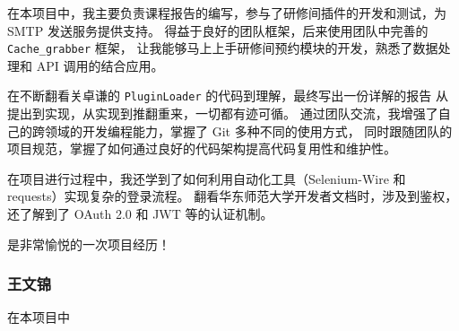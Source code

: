 \documentclass[14pt,a4paper,UTF8,twoside]{article}
\begin{document}
\begin{Thought}
    在本项目中，我主要负责课程报告的编写，参与了研修间插件的开发和测试，为 SMTP 发送服务提供支持。
    得益于良好的团队框架，后来使用团队中完善的 \texttt{Cache\_grabber} 框架，
    让我能够马上上手研修间预约模块的开发，熟悉了数据处理和 API 调用的结合应用。

\vspace{0.3cm}

    在不断翻看关卓谦的 \texttt{PluginLoader} 的代码到理解，最终写出一份详解的报告
    从提出到实现，从实现到推翻重来，一切都有迹可循。
    通过团队交流，我增强了自己的跨领域的开发编程能力，掌握了 Git 多种不同的使用方式，
    同时跟随团队的项目规范，掌握了如何通过良好的代码架构提高代码复用性和维护性。

\vspace{0.3cm}

    在项目进行过程中，我还学到了如何利用自动化工具（Selenium-Wire 和 requests）实现复杂的登录流程。
    翻看华东师范大学开发者文档时，涉及到鉴权，还了解到了 OAuth 2.0 和 JWT 等的认证机制。

\vspace{0.3cm}

    是非常愉悦的一次项目经历！

\end{Thought}

\subsubsection*{王文锦}

\begin{Thought}
在本项目中
\end{Thought}
\end{document}

